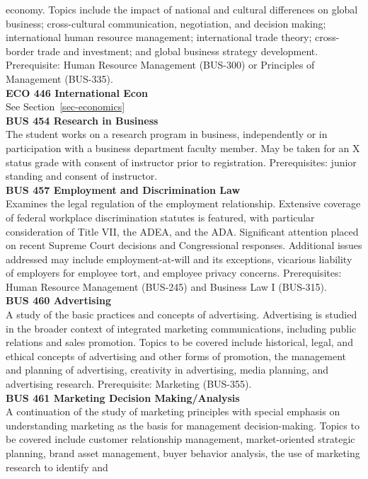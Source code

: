 \documentclass[
  letterpaper,
]{scrbook}
\begin{document}
economy. Topics include the impact of national and cultural differences
on global business; cross-cultural communication, negotiation, and
decision making; international human resource management; international
trade theory; cross-border trade and investment; and global business
strategy development. Prerequisite: Human Resource Management (BUS-300)
or Principles of Management (BUS-335).\\
\textbf{ECO 446 International Econ}\\
See Section~\ref{sec-economics}\\
\textbf{BUS 454 Research in Business}\\
The student works on a research program in business, independently or in
participation with a business department faculty member. May be taken
for an X status grade with consent of instructor prior to registration.
Prerequisites: junior standing and consent of instructor.\\
\textbf{BUS 457 Employment and Discrimination Law}\\
Examines the legal regulation of the employment relationship. Extensive
coverage of federal workplace discrimination statutes is featured, with
particular consideration of Title VII, the ADEA, and the ADA.
Significant attention placed on recent Supreme Court decisions and
Congressional responses. Additional issues addressed may include
employment-at-will and its exceptions, vicarious liability of employers
for employee tort, and employee privacy concerns. Prerequisites: Human
Resource Management (BUS-245) and Business Law I (BUS-315).\\
\textbf{BUS 460 Advertising}\\
A study of the basic practices and concepts of advertising. Advertising
is studied in the broader context of integrated marketing
communications, including public relations and sales promotion. Topics
to be covered include historical, legal, and ethical concepts of
advertising and other forms of promotion, the management and planning of
advertising, creativity in advertising, media planning, and advertising
research. Prerequisite: Marketing (BUS-355).\\
\textbf{BUS 461 Marketing Decision Making/Analysis}\\
A continuation of the study of marketing principles with special
emphasis on understanding marketing as the basis for management
decision-making. Topics to be covered include customer relationship
management, market-oriented strategic planning, brand asset management,
buyer behavior analysis, the use of marketing research to identify and
\end{document}
